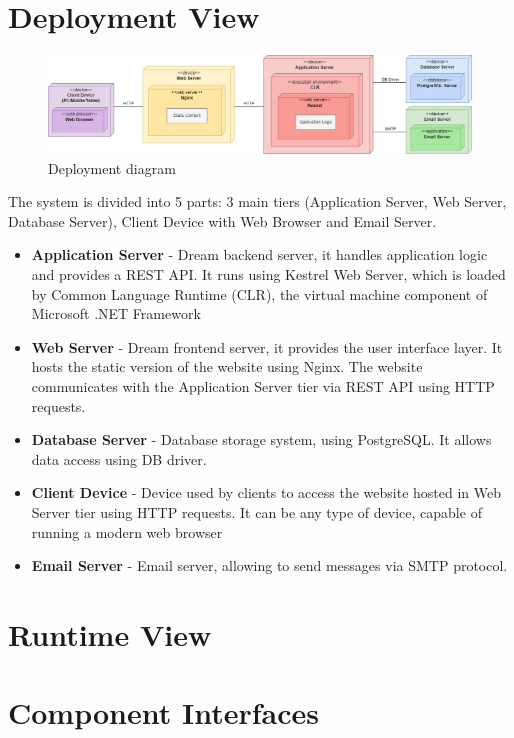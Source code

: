 \section{Deployment View}
\begin{figure}[H]
    \centering
    \includegraphics[width=\textwidth]{diagrams/deployment.png}
    \caption{Deployment diagram}
    \label{fig:deployment}
\end{figure}
The system is divided into 5 parts: 3 main tiers (Application Server, Web Server, Database Server), Client Device with Web Browser and Email Server.
\begin{itemize}
    \item \textbf{Application Server} - Dream backend server, it handles application logic and provides a REST API. It runs using Kestrel Web Server, which is loaded by Common Language Runtime (CLR), the virtual machine component of Microsoft .NET Framework
    \item \textbf{Web Server} - Dream frontend server, it provides the user interface layer. It hosts the static version of the website using Nginx. The website communicates with the Application Server tier via REST API using HTTP requests.
    \item \textbf{Database Server} - Database storage system, using PostgreSQL. It allows data access using DB driver. 
    \item \textbf{Client Device} - Device used by clients to access the website hosted in Web Server tier using HTTP requests. It can be any type of device, capable of running a modern web browser
    \item \textbf{Email Server} - Email server, allowing to send messages via SMTP protocol.
\end{itemize}


\section{Runtime View}

\section{Component Interfaces}

